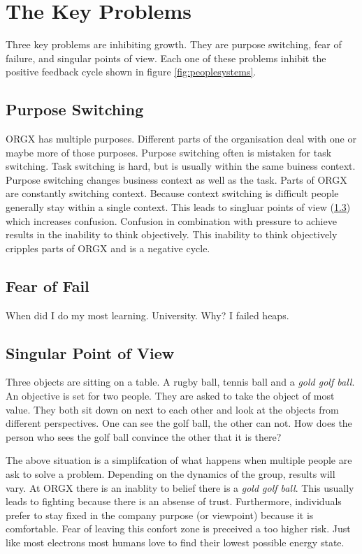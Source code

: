 \documentclass[conference]{IEEEtran}
\begin{document}
\section{The Key Problems}
Three key problems are inhibiting growth. They are purpose switching, fear of
failure, and singular points of view. Each one of these problems inhibit
the positive feedback cycle shown in figure \ref{fig:peoplesystems}.

\subsection{Purpose Switching}
ORGX has multiple purposes. Different parts of the organisation deal with one
or maybe more of those purposes. Purpose switching often is mistaken for
task switching. Task switching is hard, but is usually within the same buiness
context. Purpose switching changes business context as well as the task. Parts
of ORGX are constantly switching context. Because context switching is difficult
people generally stay within a single context. This leads to singluar points of
view (\ref{sec:singularPointOfView}) which increases confusion. Confusion in
combination with pressure to achieve results in the inability to think
objectively. This inability to think objectively cripples parts of ORGX and is
a negative cycle. 

\subsection{Fear of Fail}
When did I do my most learning. University. Why? I failed heaps.



\subsection{Singular Point of View}
\label{sec:singularPointOfView}
Three objects are sitting on a table. A rugby ball, tennis ball and a \emph{gold
golf ball}. An objective is set for two people. They are asked to take the
object of most value. They both sit down on next to each other and look at the objects
from different perspectives. One can see the golf ball, the other can not. How
does the person who sees the golf ball convince the other that it is there?

The above situation is a simplifcation of what happens when multiple people are
ask to solve a problem. Depending on the dynamics of the group, results
will vary. At ORGX there is an inablity to belief there is a \emph{gold golf
ball}. This usually leads to fighting because there is an absense of trust.
Furthermore, individuals prefer to stay fixed in the company purpose (or
viewpoint) because it is comfortable. Fear of leaving this confort zone is
preceived a too higher risk. Just like most electrons most humans love to find
their lowest possible energy state.
\end{document}
